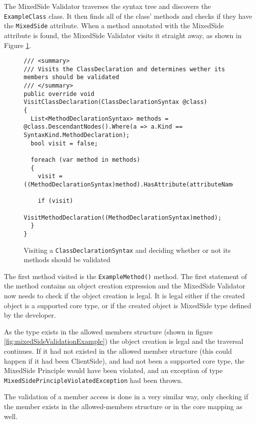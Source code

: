 The MixedSide Validator traverses the syntax tree and discovers the \texttt{ExampleClass} class. It then finds all of the class' methods and checks if they have the \texttt{MixedSide} attribute. When a method annotated with the MixedSide attribute is found, the MixedSide Validator visits it straight away, as shown in Figure \ref{fig:ValidatorVisitClassDeclaration}. 

\begin{figure}[H]
	\begin{lstlisting}[language=CSharp,classoffset=1,morekeywords={ClassDeclarationSyntax,SyntaxKind,MethodDeclarationSyntax,List}]
/// <summary>
/// Visits the ClassDeclaration and determines wether its members should be validated
/// </summary>
public override void VisitClassDeclaration(ClassDeclarationSyntax @class)
{
  List<MethodDeclarationSyntax> methods = @class.DescendantNodes().Where(a => a.Kind == SyntaxKind.MethodDeclaration);
  bool visit = false;

  foreach (var method in methods)
  {
    visit = ((MethodDeclarationSyntax)method).HasAttribute(attributeName);

    if (visit)
      VisitMethodDeclaration((MethodDeclarationSyntax)method);
  }
}
	\end{lstlisting}
	\caption{Visiting a \texttt{ClassDeclarationSyntax} and deciding whether or not its methods should be validated}
	\label{fig:ValidatorVisitClassDeclaration}
\end{figure}


The first method visited is the \texttt{ExampleMethod()} method. The first statement of the method contains an object creation expression and the MixedSide Validator now needs to check if the object creation is legal. It is legal either if the created object is a supported core type, or if the created object is MixedSide type defined by the developer.



As the type exists in the allowed members structure (shown in figure \ref{fig:mixedSideValidationExample}) the object creation is legal and the traversal continues. If it had not existed in the allowed member structure (this could happen if it had been ClientSide), and had not been a supported core type, the MixedSide Principle would have been violated, and an exception of type \texttt{MixedSidePrincipleViolatedException} had been thrown.

The validation of a member access is done in a very similar way, only checking if the member exists in the allowed-members structure or in the core mapping as well.

